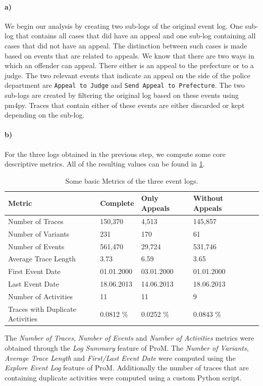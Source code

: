 \documentclass[12pt]{report}
\begin{document}
\paragraph{\textbf{a)}}
We begin our analysis by creating two sub-logs of the original event log. One sub-log that contains all cases that did have an appeal and one sub-log containing all cases that did not have an appeal. The distinction between such cases is made based on events that are related to appeals. We know that there are two ways in which an offender can appeal. There either is an appeal to the prefecture or to a judge. The two relevant events that indicate an appeal on the side of the police department are \texttt{Appeal to Judge} and \texttt{Send Appeal to Prefecture}. The two sub-logs are created by filtering the original log based on these events using pm4py. Traces that contain either of these events are either discarded or kept depending on the sub-log.

\paragraph{\textbf{b)}}
For the three logs obtained in the previous step, we compute some core descriptive metrics. All of the resulting values can be found in \ref{tab:1b}.
\begin{table}[H]
\centering
\begin{tabular}{|l|l|l|l|l|}
	\hline \textbf{Metric} & \textbf{Complete} & \textbf{Only Appeals} & \textbf{Without Appeals} \\
	\hline Number of Traces & 150,370 & 4,513 & 145,857\\
	\hline Number of Variants & 231 & 170 &61\\
	\hline Number of Events & 561,470 & 29,724 & 531,746\\
	\hline Average Trace Length & 3.73 & 6.59 & 3.65\\
	\hline First Event Date & 01.01.2000 & 03.01.2000 & 01.01.2000\\
	\hline Last Event Date & 18.06.2013 & 14.06.2013 & 18.06.2013\\
	\hline Number of Activities & 11 & 11 & 9 \\
	\hline Traces with Duplicate Activities  & 0.0812 \% & 0.0252 \% & 0.0843 \%\\
	\hline
\end{tabular}
\caption{Some basic Metrics of the three event logs.}
\label{tab:1b}
\end{table}
The \emph{Number of Traces}, \emph{Number of Events} and \emph{Number of Activities} metrics were obtained through the \emph{Log Summary} feature of ProM. The \emph{Number of Variants}, \emph{Average Trace Length} and \emph{First/Last Event Date} were computed using the \emph{Explore Event Log} feature of ProM. Additionally the number of traces that are containing duplicate activities were computed using a custom Python script.
\end{document}
